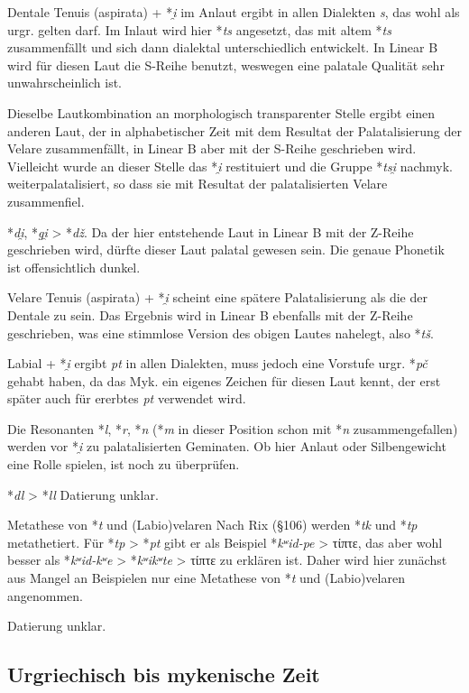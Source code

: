 \documentclass[12pt,a4paper,normalheadings]{scrartcl}
\newcounter{para}
\newcommand{\mypara}[1]{\vspace{1em}\par\noindent\refstepcounter{para}%
\textbf{\textsf{\thepara}}\enspace\textsf{#1}\quad}
\def\rek#1{*\textit{#1}}
\def\bel#1{\textit{#1}}
\begin{document}
Dentale Tenuis (aspirata) + \rek{i̯} im Anlaut ergibt in allen Dialekten \bel{s},
das wohl als urgr. gelten darf.
Im Inlaut wird hier \rek{ts} angesetzt, das mit altem \rek{ts} zusammenfällt
und sich dann dialektal unterschiedlich entwickelt.
In Linear B wird für diesen Laut die S-Reihe benutzt,
weswegen eine palatale Qualität sehr unwahrscheinlich ist.

Dieselbe Lautkombination an morphologisch transparenter Stelle
ergibt einen anderen Laut,
der in alphabetischer Zeit mit dem Resultat der Palatalisierung der
Velare zusammenfällt,
in Linear B aber mit der S-Reihe geschrieben wird.
Vielleicht wurde an dieser Stelle das \rek{i̯} restituiert
und die Gruppe \rek{tsi̯} nachmyk. weiterpalatalisiert,
so dass sie mit Resultat der palatalisierten Velare zusammenfiel.

\rek{di̯}, \rek{gi̯} > \rek{dž}.
Da der hier entstehende Laut in Linear B mit der Z-Reihe geschrieben wird,
dürfte dieser Laut palatal gewesen sein.
Die genaue Phonetik ist offensichtlich dunkel.

Velare Tenuis (aspirata) + \rek{i̯} scheint eine spätere Palatalisierung
als die der Dentale zu sein.
Das Ergebnis wird in Linear B ebenfalls mit der Z-Reihe geschrieben,
was eine stimmlose Version des obigen Lautes nahelegt,
also \rek{tš}.

Labial + \rek{i̯} ergibt \bel{pt} in allen Dialekten,
muss jedoch eine Vorstufe urgr. \rek{pč} gehabt haben,
da das Myk. ein eigenes Zeichen für diesen Laut kennt,
der erst später auch für ererbtes \bel{pt} verwendet wird.

Die Resonanten \rek{l}, \rek{r}, \rek{n}
(\rek{m} in dieser Position schon mit \rek{n} zusammengefallen)
werden vor \rek{i̯} zu palatalisierten Geminaten.
Ob hier Anlaut oder Silbengewicht eine Rolle spielen, ist noch zu überprüfen.

\mypara{\rek{dl} > \rek{ll}}
Datierung unklar.

\mypara{Metathese von \rek{t} und (Labio)velaren}
Nach Rix (§106) werden \rek{tk} und \rek{tp} metathetiert.
Für \rek{tp} > \rek{pt} gibt er als Beispiel \rek{kʷid-pe} > τίπτε,
das aber wohl besser als \rek{kʷid-kʷe} > \rek{kʷikʷte} > τίπτε zu erklären ist.
Daher wird hier zunächst aus Mangel an Beispielen nur eine Metathese von
\rek{t} und (Labio)velaren angenommen.

Datierung unklar.

\subsection{Urgriechisch bis mykenische Zeit}
\end{document}

